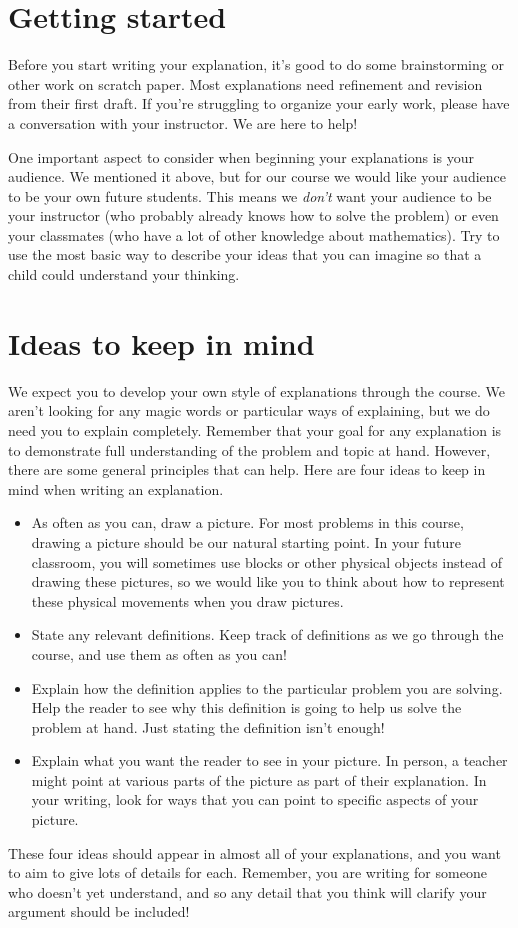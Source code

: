 \documentclass[noauthor,nooutcomes]{ximera}
\begin{document}
\section{Getting started}
Before you start writing your explanation, it's good to do some brainstorming or other work on scratch paper. Most explanations need refinement and revision from their first draft. If you're struggling to organize your early work, please have a conversation with your instructor. We are here to help!

One important aspect to consider when beginning your explanations is your audience. We mentioned it above, but for our course we would like your audience to be your own future students. This means we {\em don't} want your audience to be your instructor (who probably already knows how to solve the problem) or even your classmates (who have a lot of other knowledge about mathematics). Try to use the most basic way to describe your ideas that you can imagine so that a child could understand your thinking.

\section{Ideas to keep in mind}
We expect you to develop your own style of explanations through the course. We aren't looking for any magic words or particular ways of explaining, but we do need you to explain completely. Remember that your goal for any explanation is to demonstrate full understanding of the problem and topic at hand. However, there are some general principles that can help. Here are four ideas to keep in mind when writing an explanation.
\begin{itemize}
	\item As often as you can, draw a picture. For most problems in this course, drawing a picture should be our natural starting point. In your future classroom, you will sometimes use blocks or other physical objects instead of drawing these pictures, so we would like you to think about how to represent these physical movements when you draw pictures.
	\item State any relevant definitions. Keep track of definitions as we go through the course, and use them as often as you can!
	\item Explain how the definition applies to the particular problem you are solving. Help the reader to see why this definition is going to help us solve the problem at hand. Just stating the definition isn't enough!
	\item Explain what you want the reader to see in your picture. In person, a teacher might point at various parts of the picture as part of their explanation. In your writing, look for ways that you can point to specific aspects of your picture.
\end{itemize}
These four ideas should appear in almost all of your explanations, and you want to aim to give lots of details for each. Remember, you are writing for someone who doesn't yet understand, and so any detail that you think will clarify your argument should be included!
\end{document}
